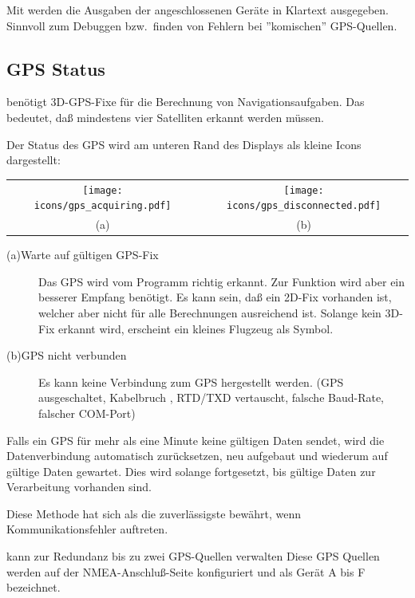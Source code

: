 Mit  werden die Ausgaben der angeschlossenen Geräte in Klartext  ausgegeben. 
Sinnvoll zum Debuggen bzw.\ finden von Fehlern bei ''komischen'' GPS-Quellen.

\subsection*{GPS Status}

\xc benötigt 3D-GPS-Fixe für die Berechnung von Navigationsaufgaben. Das bedeutet, daß mindestens vier Satelliten erkannt werden müssen.

Der Status des GPS wird am unteren Rand des Displays als kleine Icons dargestellt:

\begin{center}\begin{tabular}{c c}%
\texttt{[image: icons/gps\_acquiring.pdf]} & \texttt{[image: icons/gps\_disconnected.pdf]}\\
(a) & (b)
\end{tabular}\end{center}

\begin{description}
\item[(a)\quad Warte auf gültigen GPS-Fix]  Das GPS wird vom Programm richtig erkannt. Zur Funktion wird aber ein besserer Empfang benötigt. Es kann sein, daß ein 2D-Fix vorhanden ist, welcher aber nicht für alle Berechnungen ausreichend ist. Solange kein 3D-Fix erkannt wird, erscheint ein kleines Flugzeug als Symbol.

\item[(b)\quad GPS nicht verbunden]  Es kann keine Verbindung zum GPS hergestellt werden.
 (GPS ausgeschaltet, Kabelbruch , RTD/TXD vertauscht, falsche Baud-Rate, falscher COM-Port)
\end{description}

Falls ein GPS für mehr als eine Minute keine gültigen Daten sendet, wird \xc die Datenverbindung automatisch zurücksetzen, neu aufgebaut und wiederum auf gültige Daten gewartet. Dies wird solange fortgesetzt, bis gültige Daten zur Verarbeitung vorhanden sind. 

Diese Methode hat sich als die zuverlässigste bewährt, wenn Kommunikationsfehler auftreten.

\xc kann zur Redundanz bis zu zwei GPS-Quellen verwalten
Diese GPS Quellen werden auf der NMEA-Anschluß-Seite konfiguriert
 und als Gerät A bis F bezeichnet. 

